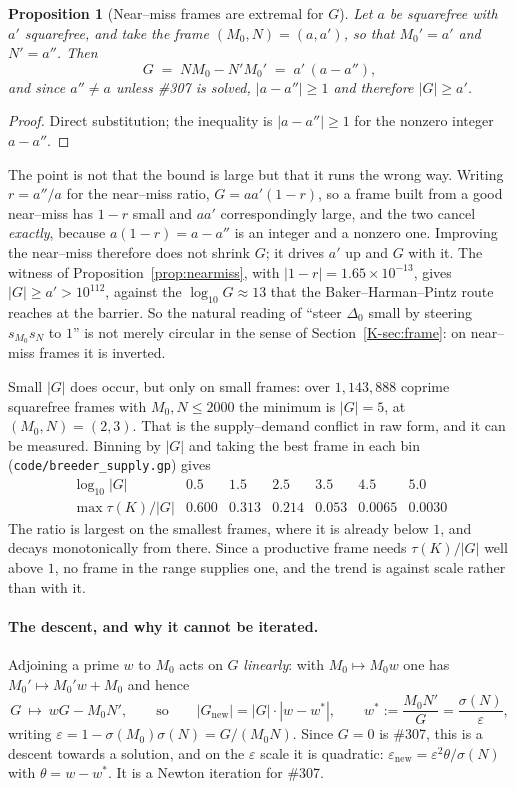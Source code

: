 \documentclass[11pt]{article}
\newtheorem{proposition}[theorem]{Proposition}
\theoremstyle{definition}
\begin{document}
\begin{proposition}[Near--miss frames are extremal for $G$]\label{prop:nearframe}
Let $a$ be squarefree with $a'$ squarefree, and take the frame $(M_0,N)=(a,a')$, so that
$M_0'=a'$ and $N'=a''$. Then
\[ G\;=\;NM_0-N'M_0'\;=\;a'\,(a-a''), \]
and since $a''\ne a$ unless \#307 is solved, $|a-a''|\ge1$ and therefore $|G|\ge a'$.
\end{proposition}
\begin{proof}
Direct substitution; the inequality is $|a-a''|\ge1$ for the nonzero integer $a-a''$.
\end{proof}

The point is not that the bound is large but that it runs the wrong way. Writing $r=a''/a$ for the
near--miss ratio, $G=aa'(1-r)$, so a frame built from a good near--miss has $1-r$ small and $aa'$
correspondingly large, and the two cancel \emph{exactly}, because $a(1-r)=a-a''$ is an integer and a
nonzero one. Improving the near--miss therefore does not shrink $G$; it drives $a'$ up and $G$ with
it. The witness of Proposition~\ref{prop:nearmiss}, with $|1-r|=1.65\times10^{-13}$, gives
$|G|\ge a'>10^{112}$, against the $\log_{10}G\approx13$ that the Baker--Harman--Pintz route reaches
at the barrier. So the natural reading of ``steer $\Delta_0$ small by steering $s_{M_0}s_N$ to $1$''
is not merely circular in the sense of Section~\ref{K-sec:frame}: on near--miss frames it is inverted.

Small $|G|$ does occur, but only on small frames: over $1{,}143{,}888$ coprime squarefree frames with
$M_0,N\le2000$ the minimum is $|G|=5$, at $(M_0,N)=(2,3)$. That is the supply--demand conflict in raw
form, and it can be measured. Binning by $|G|$ and taking the best frame in each bin
(\texttt{code/breeder\_supply.gp}) gives
\[
\begin{array}{l|cccccc}
\log_{10}|G| & 0.5 & 1.5 & 2.5 & 3.5 & 4.5 & 5.0\\\hline
\max \tau(K)/|G| & 0.600 & 0.313 & 0.214 & 0.053 & 0.0065 & 0.0030
\end{array}
\]
The ratio is largest on the smallest frames, where it is already below $1$, and decays monotonically
from there. Since a productive frame needs $\tau(K)/|G|$ well above $1$, no frame in the range
supplies one, and the trend is against scale rather than with it.

\paragraph{The descent, and why it cannot be iterated.} Adjoining a prime $w$ to $M_0$ acts on
$G$ \emph{linearly}: with $M_0\mapsto M_0w$ one has $M_0'\mapsto M_0'w+M_0$ and hence
\[ G\ \longmapsto\ wG-M_0N', \qquad\text{so}\qquad |G_{\mathrm{new}}|=|G|\cdot|w-w^{*}|,
   \qquad w^{*}:=\frac{M_0N'}{G}=\frac{\sigma(N)}{\varepsilon}, \]
writing $\varepsilon=1-\sigma(M_0)\sigma(N)=G/(M_0N)$. Since $G=0$ is \#307, this is a descent
towards a solution, and on the $\varepsilon$ scale it is quadratic: $\varepsilon_{\mathrm{new}}
=\varepsilon^{2}\theta/\sigma(N)$ with $\theta=w-w^{*}$. It is a Newton iteration for \#307.
\end{document}
